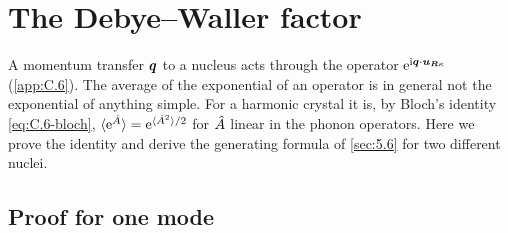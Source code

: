 \section{The Debye--Waller factor}\label{app:D.15}

A momentum transfer $\bm{q}$ to a nucleus acts through the operator $\mathrm{e}^{\mathrm{i}\bm{q}\cdot\bm{u}_{\bm{R}\kappa}}$ (\cref{app:C.6}). The average of the exponential of an operator is in general not the exponential of anything simple. For a harmonic crystal it is, by Bloch's identity \cref{eq:C.6-bloch}, $\langle\mathrm{e}^{\hat{A}}\rangle = \mathrm{e}^{\langle\hat{A}^2\rangle/2}$ for $\hat{A}$ linear in the phonon operators. Here we prove the identity and derive the generating formula of \cref{sec:5.6} for two different nuclei.

\subsection*{Proof for one mode}

